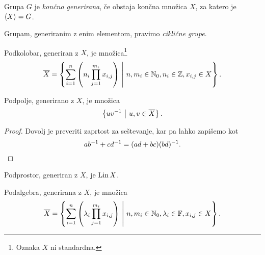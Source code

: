\obvs

\begin{definicija}
Grupa $G$ je
\emph{končno generirana},
če obstaja končna množica $X$, za katero je $\left\langle X\right\rangle = G$.
\end{definicija}

\begin{opomba}
Grupam, generiranim z enim elementom, pravimo
\emph{ciklične grupe}.
\end{opomba}

\begin{trditev}
Podkolobar, generiran z $X$, je množica\footnote{Oznaka
$\overline{X}$ ni standardna.}
\[
\overline{X} =
\left\{\sum_{i=1}^n \left(n_i \prod_{j=1}^{m_i} x_{i,j}\right)~\middle\vert~n,m_i \in \mathbb{N}_0, n_i \in \mathbb{Z}, x_{i,j} \in X\right\}.
\]
\end{trditev}

\obvs

\begin{trditev}
Podpolje, generirano z $X$, je množica
\[
\left\{uv^{-1}~\middle\vert~u,v \in \overline{X}\right\}.
\]
\end{trditev}

\begin{proof}
Dovolj je preveriti zaprtost za seštevanje, kar pa lahko zapišemo
kot
\[
ab^{-1} + cd^{-1} = (ad + bc)(bd)^{-1}. \qedhere
\]
\end{proof}

\begin{trditev}
Podprostor, generiran z $X$, je $\operatorname{Lin} X$.
\end{trditev}

\obvs

\begin{trditev}
Podalgebra, generirana z $X$, je množica
\[
\overline{X} =
\left\{
\sum_{i=1}^n \left(\lambda_i \prod_{j=1}^{m_i} x_{i,j}\right)
~\middle\vert~
n,m_i \in \mathbb{N}_0, \lambda_i \in \mathbb{F}, x_{i,j} \in X
\right\}.
\]
\end{trditev}
